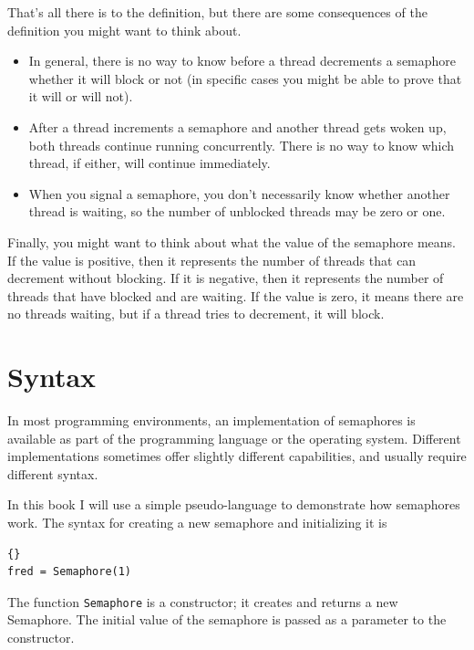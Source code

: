 \documentclass{book}
\begin{document}
That's all there is to the definition, but there are some
consequences of the definition you might want to think about.

\begin{itemize}

    \item In general, there is no way to know before a thread decrements a
          semaphore whether it will block or not (in specific cases you might
          be able to prove that it will or will not).

    \item After a thread increments a semaphore and another thread gets
          woken up, both threads continue running concurrently.  There is no way
          to know which thread, if either, will continue immediately.

    \item When you signal a semaphore, you don't necessarily know whether
          another thread is waiting, so the number of unblocked threads may
          be zero or one.

\end{itemize}

Finally, you might want to think about what the value of the
semaphore means.  If the value is positive, then it represents the
number of threads that can decrement without blocking.  If it
is negative, then it represents the number of threads that have
blocked and are waiting.  If the value is zero, it means there
are no threads waiting, but if a thread tries to decrement, it
will block.


\section{Syntax}

In most programming environments, an implementation of semaphores is
available as part of the programming language or the operating system.
Different implementations sometimes offer slightly different
capabilities, and usually require different syntax.

In this book I will use a simple pseudo-language to demonstrate
how semaphores work.  The syntax for creating a new semaphore
and initializing it is
%
\begin{lstlisting}[title={Semaphore initialization syntax}]{}
fred = Semaphore(1)
\end{lstlisting}
%
The function {\tt Semaphore} is a constructor; it creates and
returns a new Semaphore.  The initial value of the semaphore
is passed as a parameter to the constructor.
\end{document}
